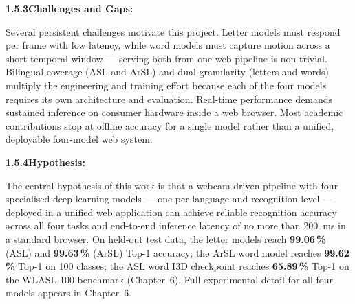 \noindent\textbf{1.5.3\quad Challenges and Gaps:}\par
{}
\vspace{0.3cm}

\noindent Several persistent challenges motivate this project. Letter models must respond per frame with low latency, while word models must capture motion across a short temporal window --- serving both from one web pipeline is non-trivial. Bilingual coverage (ASL and ArSL) and dual granularity (letters and words) multiply the engineering and training effort because each of the four models requires its own architecture and evaluation. Real-time performance demands sustained inference on consumer hardware inside a web browser. Most academic contributions stop at offline accuracy for a single model rather than a unified, deployable four-model web system.\par\vspace{0.4cm}

\noindent\textbf{1.5.4\quad Hypothesis:}\par
{}
\vspace{0.3cm}

\noindent The central hypothesis of this work is that a webcam-driven pipeline with four specialised deep-learning models --- one per language and recognition level --- deployed in a unified web application can achieve reliable recognition accuracy across all four tasks and end-to-end inference latency of no more than 200~ms in a standard browser. On held-out test data, the letter models reach \textbf{99.06\,\%} (ASL) and \textbf{99.63\,\%} (ArSL) Top-1 accuracy; the ArSL word model reaches \textbf{99.62\,\%} Top-1 on 100 classes; the ASL word I3D checkpoint reaches \textbf{65.89\,\%} Top-1 on the WLASL-100 benchmark (Chapter~6). Full experimental detail for all four models appears in Chapter~6.\par\vspace{0.6cm}

